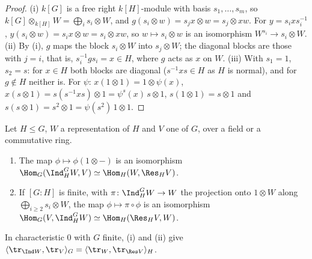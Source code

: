\begin{proof}
(i) $k[G]$ is a free right $k[H]$-module with basis $s_1,\dots,s_m$, so $k[G]\otimes_{k[H]}W=\bigoplus_is_i\otimes W$, and
$g(s_i\otimes w)=s_jx\otimes w=s_j\otimes xw$. For $y=s_ixs_i^{-1}$, $y(s_i\otimes w)=s_ix\otimes w=s_i\otimes xw$, so $w\mapsto s_i\otimes w$ is an isomorphism
$W^{s_i}\to s_i\otimes W$.
(ii) By (i), $g$ maps the block $s_i\otimes W$ into $s_j\otimes W$; the diagonal blocks are those with $j=i$, that is, $s_i^{-1}gs_i=x\in H$, where $g$ acts
as $x$ on $W$.
(iii) With $s_1=1$, $s_2=s$: for $x\in H$ both blocks are diagonal ($s^{-1}xs\in H$ as $H$ is normal), and for $g\notin H$ neither is. For $\psi$:
$x(1\otimes1)=1\otimes\psi(x)$, $x(s\otimes1)=s(s^{-1}xs)\otimes1=\psi^s(x)\,s\otimes1$, $s(1\otimes1)=s\otimes1$ and $s(s\otimes1)=s^2\otimes1=\psi(s^2)\,1\otimes1$.
\end{proof}

\begin{theorem}\label{thm:reps:frobenius-reciprocity}
Let $H\le G$, $W$ a representation of $H$ and $V$ one of $G$, over a field or a commutative ring.
\begin{enumerate}[label=(\roman*)]
\item The map $\phi\mapsto\phi(1\otimes{-})$ is an isomorphism $\Hom_G(\Ind_H^GW,V)\simeq\Hom_H(W,\Res_HV)$.
\item If $[G:H]$ is finite, with $\pi\colon\Ind_H^GW\to W$ the projection onto $1\otimes W$ along $\bigoplus_{i\ge2}s_i\otimes W$, the map $\phi\mapsto\pi\circ\phi$ is an
isomorphism $\Hom_G(V,\Ind_H^GW)\simeq\Hom_H(\Res_HV,W)$.
\end{enumerate}
In characteristic $0$ with $G$ finite, (i) and (ii) give $\langle\tr_{\Ind W},\tr_V\rangle_G=\langle\tr_W,\tr_{\Res V}\rangle_H$.
\end{theorem}

